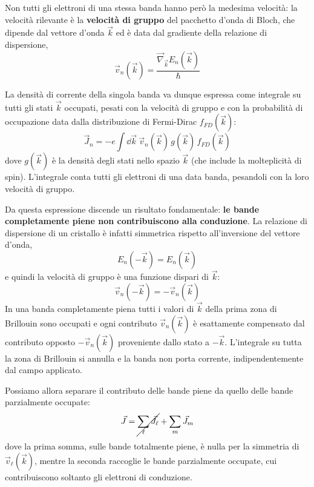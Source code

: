 Non tutti gli elettroni di una stessa banda hanno però la medesima velocità: la velocità rilevante è la \textbf{velocità di gruppo} del pacchetto d'onda di Bloch, che dipende dal vettore d'onda \( \vec{k} \) ed è data dal gradiente della relazione di dispersione,
\begin{equation}
    \vec{v}_n(\vec{k}) = \frac{\vec{\nabla}_{\vec{k}} E_n(\vec{k})}{\hbar}
\end{equation}

La densità di corrente della singola banda va dunque espressa come integrale su tutti gli stati \( \vec{k} \) occupati, pesati con la velocità di gruppo e con la probabilità di occupazione data dalla distribuzione di Fermi-Dirac \( f_{FD}(\vec{k}) \):
\begin{equation}
    \vec{J}_n = -e \int \dd \vec{k} \ \vec{v}_n(\vec{k}) \, g(\vec{k}) \, f_{FD}(\vec{k})
\end{equation}
dove \( g(\vec{k}) \) è la densità degli stati nello spazio \( \vec{k} \) (che include la molteplicità di spin). L'integrale conta tutti gli elettroni di una data banda, pesandoli con la loro velocità di gruppo.

Da questa espressione discende un risultato fondamentale: \textbf{le bande completamente piene non contribuiscono alla conduzione}. La relazione di dispersione di un cristallo è infatti simmetrica rispetto all'inversione del vettore d'onda,
\begin{equation}
    E_n(-\vec{k}) = E_n(\vec{k})
\end{equation}
e quindi la velocità di gruppo è una funzione dispari di \( \vec{k} \):
\begin{equation}
    \vec{v}_n(-\vec{k}) = -\vec{v}_n(\vec{k})
\end{equation}
In una banda completamente piena tutti i valori di \( \vec{k} \) della prima zona di Brillouin sono occupati e ogni contributo \( \vec{v}_n(\vec{k}) \) è esattamente compensato dal contributo opposto \( -\vec{v}_n(\vec{k}) \) proveniente dallo stato a \( -\vec{k} \). L'integrale su tutta la zona di Brillouin si annulla e la banda non porta corrente, indipendentemente dal campo applicato.

Possiamo allora separare il contributo delle bande piene da quello delle bande parzialmente occupate:
\begin{equation}
    \vec{J} = \cancel{\sum_\ell \vec{J}_\ell} + \sum_m \vec{J}_m
\end{equation}
dove la prima somma, sulle bande totalmente piene, è nulla per la simmetria di \( \vec{v}_\ell(\vec{k}) \), mentre la seconda raccoglie le bande parzialmente occupate, cui contribuiscono soltanto gli elettroni di conduzione.

